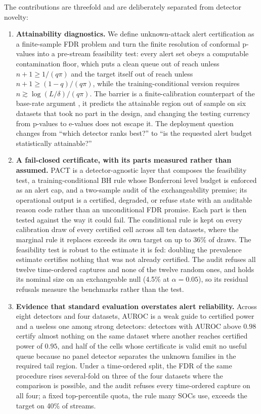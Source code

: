 \documentclass[a4paper,fleqn]{cas-dc}
\newcommand{\PACT}{PACT\xspace}
\begin{document}
The contributions are threefold and are deliberately separated from detector novelty:
\begin{enumerate}
  \item \textbf{Attainability diagnostics.} We define unknown-attack alert certification as a finite-sample FDR problem and turn the finite resolution of conformal p-values into a pre-stream feasibility test: every alert set obeys a computable contamination floor, which puts a clean queue out of reach unless $n+1\ge 1/(q\pi)$ and the target itself out of reach unless $n+1\ge(1-q)/(q\pi)$, while the training-conditional version requires $n\gtrsim\log(L/\delta)/(q\pi)$. The barrier is a finite-calibration counterpart of the base-rate argument \cite{axelsson2000baserate}, it predicts the attainable region out of sample on six datasets that took no part in the design, and changing the testing currency from p-values to e-values does not escape it. The deployment question changes from ``which detector ranks best?'' to ``is the requested alert budget statistically attainable?''
  \item \textbf{A fail-closed certificate, with its parts measured rather than assumed.} \PACT is a detector-agnostic layer that composes the feasibility test, a training-conditional BH rule whose Bonferroni level budget is enforced as an alert cap, and a two-sample audit of the exchangeability premise; its operational output is a certified, degraded, or refuse state with an auditable reason code rather than an unconditional FDR promise. Each part is then tested against the way it could fail. The conditional rule is kept on every calibration draw of every certified cell across all ten datasets, where the marginal rule it replaces exceeds its own target on up to 36\% of draws. The feasibility test is robust to the estimate it is fed: doubling the prevalence estimate certifies nothing that was not already certified. The audit refuses all twelve time-ordered captures and none of the twelve random ones, and holds its nominal size on an exchangeable null (4.5\% at $\alpha=0.05$), so its residual refusals measure the benchmarks rather than the test.
  \item \textbf{Evidence that standard evaluation overstates alert reliability.} Across eight detectors and four datasets, AUROC is a weak guide to certified power and a useless one among strong detectors: detectors with AUROC above $0.98$ certify almost nothing on the same dataset where another reaches certified power of $0.95$, and half of the cells whose certificate is valid emit no useful queue because no panel detector separates the unknown families in the required tail region. Under a time-ordered split, the FDR of the same procedure rises several-fold on three of the four datasets where the comparison is possible, and the audit refuses every time-ordered capture on all four; a fixed top-percentile quota, the rule many SOCs use, exceeds the target on 40\% of streams.
\end{enumerate}
\end{document}
